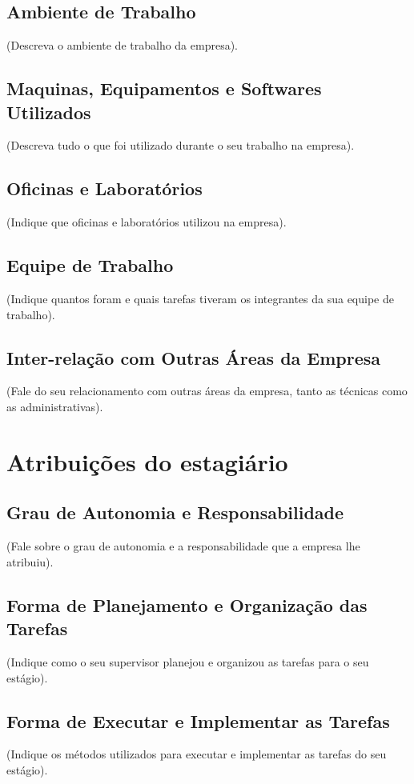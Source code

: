 \documentclass[
	12pt,				%
	openright,			%
	oneside,			%
	a4paper,			%
	english,			%
	french,				%
	spanish,			%
	brazil				%
	]{abntex2}
\begin{document}
\section{Ambiente de Trabalho}
(Descreva o ambiente de trabalho da empresa).

\section{Maquinas, Equipamentos e Softwares Utilizados}
(Descreva tudo o que foi utilizado durante o seu trabalho na empresa).

\section{Oficinas e Laboratórios}
(Indique que oficinas e laboratórios utilizou na empresa).

\section{Equipe de Trabalho}
(Indique quantos foram e quais tarefas tiveram os integrantes da sua equipe de
trabalho).

\section{Inter-relação com Outras Áreas da Empresa}
(Fale do seu relacionamento com outras áreas da empresa, tanto as técnicas como
as administrativas).

\chapter{Atribuições do estagiário}
\section{Grau de Autonomia e Responsabilidade}
(Fale sobre o grau de autonomia e a responsabilidade que a empresa lhe atribuiu).

\section{Forma de Planejamento e Organização das Tarefas}
(Indique como o seu supervisor planejou e organizou as tarefas para o seu estágio).

\section{Forma de Executar e Implementar as Tarefas}
(Indique os métodos utilizados para executar e implementar as tarefas do seu
estágio).
\end{document}
